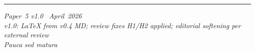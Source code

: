\documentclass[11pt]{article}
\begin{document}
\bigskip\noindent\rule{\linewidth}{0.4pt}\smallskip
\noindent\small
\emph{Paper~5 v1.0 \textperiodcentered\ April~2026}\\
\emph{v1.0: LaTeX from v0.4 MD; review fixes H1/H2 applied;
editorial softening per external review}\\
\emph{Pauca sed matura}
\end{document}
